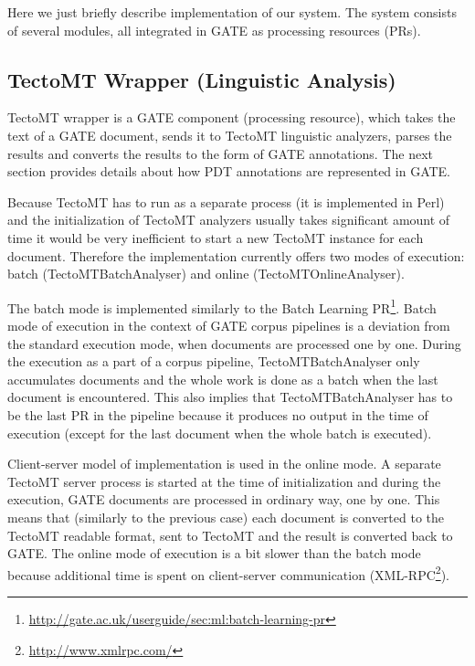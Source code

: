 Here we just briefly describe implementation of our system. The system consists of several modules, all integrated in GATE as processing resources (PRs).

\subsection{TectoMT Wrapper (Linguistic Analysis)} \label{sec:learning_tectomt_wrapper}

TectoMT wrapper is a GATE component (processing resource), which takes the text of a GATE document, sends it to TectoMT linguistic analyzers, parses the results and converts the results to the form of GATE annotations. The next section provides details about how PDT annotations are represented in GATE.

Because TectoMT has to run as a separate process (it is implemented in Perl) and the initialization of TectoMT analyzers usually takes significant amount of time it would be very inefficient to start a new TectoMT instance for each document. Therefore the implementation currently offers two modes of execution: batch (TectoMTBatchAnalyser) and online (TectoMTOnlineAnalyser).

The batch mode is implemented similarly to the Batch Learning PR\footnote{\url{http://gate.ac.uk/userguide/sec:ml:batch-learning-pr}}. Batch mode of execution in the context of GATE corpus pipelines is a deviation from the standard execution mode, when documents are processed one by one. During the execution as a part of a corpus pipeline, TectoMTBatchAnalyser only accumulates documents and the whole work is done as a batch when the last document is encountered. This also implies that TectoMTBatchAnalyser has to be the last PR in the pipeline because it produces no output in the time of execution (except for the last document when the whole batch is executed). 

Client-server model of implementation is used in the online mode. A separate TectoMT server process is started at the time of initialization and during the execution, GATE documents are processed in ordinary way, one by one. This means that (similarly to the previous case) each document is converted to the TectoMT readable format, sent to TectoMT and the result is converted back to GATE. The online mode of execution is a bit slower than the batch mode because additional time is spent on client-server communication (XML-RPC\footnote{\url{http://www.xmlrpc.com/}}).



